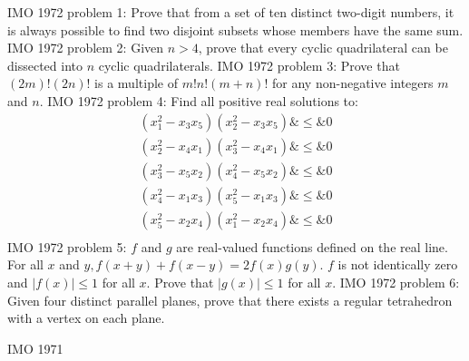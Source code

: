 IMO 1972 problem 1:  Prove that from a set of ten distinct two-digit numbers, it is always possible to find two disjoint subsets whose members have the same sum. 
IMO 1972 problem 2:  Given $n>4$, prove that every cyclic quadrilateral can be dissected into $n$ cyclic quadrilaterals. 
IMO 1972 problem 3:  Prove that $(2m)!(2n)!$ is a multiple of $m!n!(m+n)!$ for any non-negative integers $m$ and $n$. 
IMO 1972 problem 4:  Find all positive real solutions to:
\begin{eqnarray*} (x_1^2-x_3x_5)(x_2^2-x_3x_5) \&\le\& 0 \\ (x_2^2-x_4x_1)(x_3^2-x_4x_1) \&\le\& 0 \\ (x_3^2-x_5x_2)(x_4^2-x_5x_2) \&\le\& 0 \\ (x_4^2-x_1x_3)(x_5^2-x_1x_3) \&\le \& 0 \\ (x_5^2-x_2x_4)(x_1^2-x_2x_4) \&\le\& 0 \\ \end{eqnarray*} 
IMO 1972 problem 5:  $f$ and $g$ are real-valued functions defined on the real line. For all $x$ and $y, f(x+y)+f(x-y)=2f(x)g(y)$. $f$ is not identically zero and $|f(x)|\le1$ for all $x$. Prove that $|g(x)|\le1$ for all $x$. 
IMO 1972 problem 6:  Given four distinct parallel planes, prove that there exists a regular tetrahedron with a vertex on each plane. 

IMO 1971 

